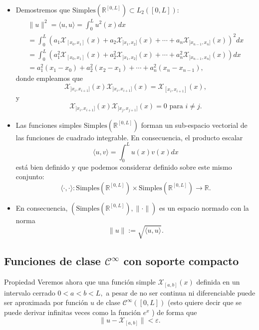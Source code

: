\documentclass[10pt,handout]{beamer}
\theoremstyle{plain} %
\theoremstyle{plain} %
\theoremstyle{plain} %
\theoremstyle{plain} %
\theoremstyle{definition}
\theoremstyle{example}
\theoremstyle{example}
\theoremstyle{remark}
\theoremstyle{remark}
\begin{document}
\begin{frame}
\begin{itemize}
\item Demostremos que $\mathrm{Simples}(\mathbb{R}^{[0,L]}) \subset L_2([0,L]):$
\begin{align*}
\|u\|^2 = \langle u,u \rangle  = \int_{0}^L u^2(x) dx \\ 
= \int_{0}^L \left( a_1 \mathcal{X}_{[x_0,x_1]}(x) + a_2 \mathcal{X}_{]x_1,x_2]}(x) + \cdots + a_n \mathcal{X}_{]x_{n-1},x_n]}(x)\right)^2 dx \\ 
= \int_{0}^L \left( a_1^2 \mathcal{X}_{[x_0,x_1]}(x) + a_2^2 \mathcal{X}_{]x_1,x_2]}(x) + \cdots + a_n^2 \mathcal{X}_{]x_{n-1},x_n]}(x)\right) dx \\ 
= a_1^2(x_1-x_0)+a_2^2(x_2-x_1)+\cdots+a_n^2(x_n-x_{n-1}),
\end{align*}
donde empleamos que
$$
\mathcal{X}_{]x_i,x_{i+1}]}(x) \mathcal{X}_{]x_i,x_{i+1}]}(x) = \mathcal{X}_{[x_i,x_{i+1}]}(x) ,
$$
y
$$
\mathcal{X}_{]x_i,x_{i+1}]}(x) \mathcal{X}_{]x_j,x_{j+1}]}(x) = 0 \text{ para } i \neq j.
$$
\end{itemize}
\end{frame}

\begin{frame}
\begin{itemize}
\item Las funciones simples $\mathrm{Simples}(\mathbb{R}^{[0,L]})$ forman un sub-espacio vectorial de 
las funciones de cuadrado integrable. En consecuencia, el producto escalar
$$
\langle u,v \rangle  = \int_{0}^L u(x)v(x) dx
$$
está bien definido y que podemos considerar definido sobre este mismo conjunto:
$$
\langle \cdot ,\cdot \rangle:\mathrm{Simples}(\mathbb{R}^{[0,L]}) \times \mathrm{Simples}(\mathbb{R}^{[0,L]}) \longrightarrow \mathbb{R}.
$$
\item En consecuencia, $(\mathrm{Simples}(\mathbb{R}^{[0,L]}),\|\cdot\|)$ es un espacio normado con la norma
$$
\|u\|:= \sqrt{\langle u,u \rangle}.
$$
\end{itemize}
\end{frame}

\subsection{Funciones de clase $\mathcal{C}^{\infty}$ con soporte compacto}

\begin{frame}{Propiedad}
Veremos ahora que una función simple $\mathcal{X}_{[a,b]}(x)$ definida 
en un intervalo cerrado  $0 < a < b < L,$ a pesar de no ser 
continua ni diferenciable puede ser aproximada por 
función $u$ de clase $\mathcal{C}^{\infty}([0,L])$ 
(esto quiere decir que se puede derivar infinitas veces como la función $e^{x}$ ) de forma que
$$
\|u-\mathcal{X}_{[a,b]}\| < \varepsilon.
$$
\end{frame}
\end{document}
